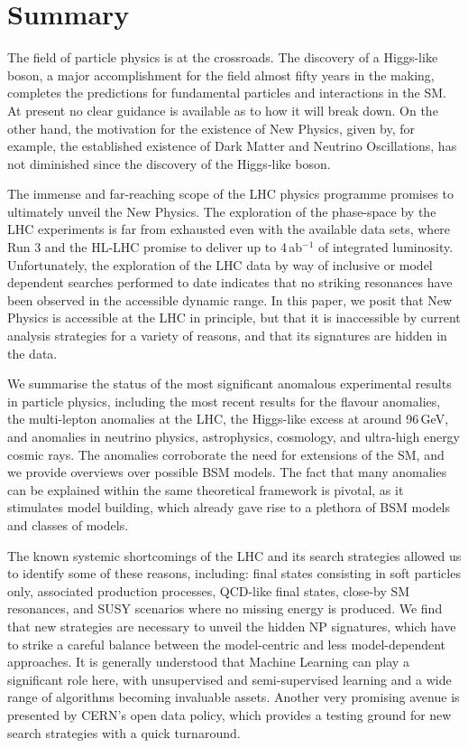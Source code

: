 \documentclass[10pt]{article}
\begin{document}
\section{Summary}
%
The field of particle physics is at the crossroads. The discovery of a Higgs-like boson, a major accomplishment for the field almost fifty years in the making, completes the predictions for fundamental particles and interactions in the SM.
At present no clear guidance is available as to how it will break down.
On the other hand, the motivation for the existence of New Physics, given by, for example, the established existence of Dark Matter and Neutrino Oscillations, has not diminished since the discovery of the Higgs-like boson. 

The immense and far-reaching scope of the LHC physics programme promises to ultimately unveil the New Physics.
The exploration of the phase-space by the LHC experiments is far from exhausted even with the available data sets, where Run 3 and the HL-LHC promise to deliver up to 4\,ab$^{-1}$ of integrated luminosity. 
Unfortunately, the exploration of the LHC data by way of inclusive or model dependent searches performed to date indicates that no striking resonances have been observed in the accessible dynamic range. 
In this paper, we posit that New Physics is accessible at the LHC in principle, but that it is inaccessible by current analysis strategies for a variety of reasons, and that its signatures are hidden in the data. 

We summarise the status of the most significant anomalous experimental results in particle physics, including the most recent results for the flavour anomalies, the multi-lepton anomalies at the LHC, the Higgs-like excess at around 96\,GeV, and anomalies in neutrino physics, astrophysics, cosmology, and ultra-high energy cosmic rays.
The anomalies corroborate the need for extensions of the SM, and we provide overviews over possible BSM models.
The fact that many anomalies can be explained within the same theoretical framework is pivotal, as it stimulates model building, which already gave rise to a plethora of BSM models and classes of models. 

The known systemic shortcomings of the LHC and its search strategies allowed us to identify some of these reasons, including: final states consisting in soft particles only, associated production processes, QCD-like final states, close-by SM resonances, and SUSY scenarios where no missing energy is produced.
%
We find that new strategies are necessary to unveil the hidden NP signatures, which have to strike a careful balance between the model-centric and less model-dependent approaches.
It is generally understood that Machine Learning can play a significant role here, with unsupervised and semi-supervised learning and a wide range of algorithms becoming invaluable assets.
Another very promising avenue is presented by CERN's open data policy, which provides a testing ground for new search strategies with a quick turnaround. 
\end{document}
